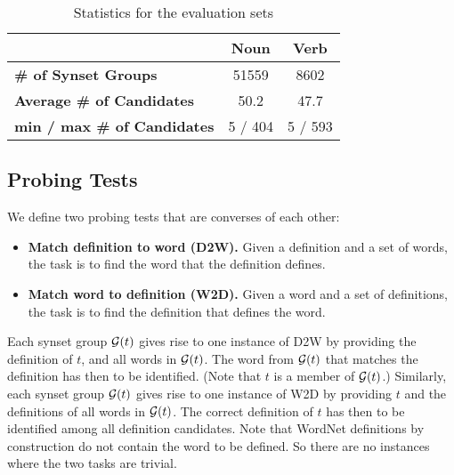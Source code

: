 \documentclass[11pt,a4paper]{article}
\begin{document}
\begin{table}
    \centering
    \begin{tabular}{l|cc}
    \hline
         & \textbf{Noun} & \textbf{Verb} \\ \hline
         \textbf{\# of Synset Groups} & 51559 & 8602 \\
         \textbf{Average \# of Candidates} & 50.2 & 47.7 \\
         \textbf{min / max \# of Candidates} & 5 / 404 & 5 / 593 \\ \hline
    \end{tabular}
    \caption{Statistics for the evaluation sets}
    \label{tab:dataset_stats}
\end{table}

\subsection{Probing Tests}

We define two probing tests that are converses of each other:
\begin{itemize}
  \item \textbf{Match definition to word (D2W).} Given a
    definition and a set of words, the task is to find the
    word that the definition defines.
  \item \textbf{Match word to definition (W2D).} Given a
    word and a set of definitions, the task is to find the
    definition that defines the word.
    \end{itemize}
Each synset group ${\cal G}(t)$ gives rise to one instance
of D2W by providing the definition of $t$, and all words in
${\cal G}(t)$. The word from ${\cal G}(t)$ that matches the
definition has then to be identified. (Note that $t$ is a
member of ${\cal G}(t)$.)
Similarly, each synset group ${\cal G}(t)$ gives rise to one instance
of W2D by providing $t$ and the definitions of all words in
${\cal G}(t)$. The
correct definition  of $t$ has then to be identified among
all definition  candidates. Note that WordNet definitions by
construction do not contain the word to be defined. So there
are no instances where the two tasks are trivial.
\end{document}
